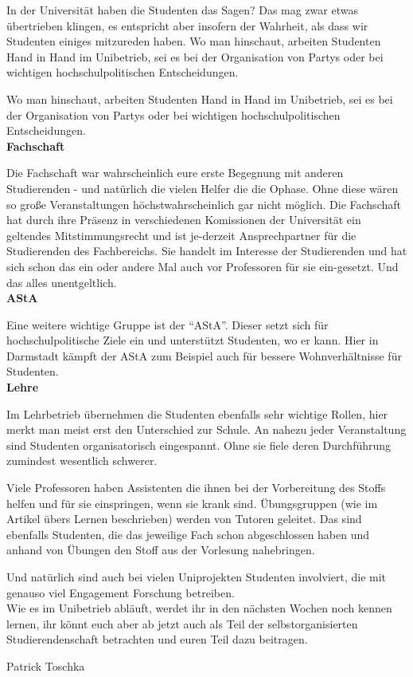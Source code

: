 {In der Universität haben die Studenten das Sagen? Das mag zwar etwas übertrieben klingen, es entspricht aber insofern der Wahrheit, als dass wir Studenten einiges mitzureden haben.
Wo man hinschaut, arbeiten Studenten Hand in Hand im Unibetrieb, sei es bei der Organisation von Partys oder bei wichtigen hochschulpolitischen Entscheidungen.
}{
Wo man hinschaut, arbeiten Studenten Hand in Hand im Unibetrieb, sei es bei der Organisation von Partys oder bei wichtigen hochschulpolitischen Entscheidungen.\\

\textbf{Fachschaft}

Die Fachschaft war wahrscheinlich eure erste Begegnung mit anderen Studierenden -  und natürlich die vielen Helfer die die Ophase. Ohne diese wären so große Veranstaltungen höchstwahrscheinlich gar nicht möglich. Die Fachschaft hat durch ihre Präsenz in verschiedenen Komissionen der Universität ein geltendes Mitstimmungsrecht und ist je-derzeit Ansprechpartner für die Studierenden des Fachbereichs. Sie handelt im Interesse der Studierenden und hat sich schon das ein oder andere Mal auch vor Professoren für sie ein-gesetzt. Und das alles unentgeltlich.\\

\textbf{AStA}

Eine weitere wichtige Gruppe ist der "`AStA"'. Dieser setzt sich für hochschulpolitische Ziele ein und unterstützt Studenten, wo er kann. Hier in Darmstadt kämpft der AStA zum Beispiel auch für bessere Wohnverhältnisse für Studenten.\\

\textbf{Lehre}

Im Lehrbetrieb übernehmen die Studenten ebenfalls sehr wichtige Rollen, hier merkt man meist erst den Unterschied zur Schule. An nahezu jeder Veranstaltung sind Studenten organisatorisch eingespannt. Ohne sie fiele deren Durchführung zumindest wesentlich schwerer.

Viele Professoren haben Assistenten die ihnen bei der Vorbereitung des Stoffs helfen und für sie einspringen, wenn sie krank sind. Übungsgruppen (wie im Artikel übers Lernen beschrieben) werden von Tutoren geleitet. Das sind ebenfalls Studenten, die das jeweilige Fach schon abgeschlossen haben und anhand von Übungen den Stoff aus der Vorlesung nahebringen. 

Und natürlich sind auch bei vielen Uniprojekten Studenten involviert, die mit genauso viel Engagement Forschung betreiben.\\

Wie es im Unibetrieb abläuft, werdet ihr in den nächsten Wochen noch kennen lernen, ihr könnt euch aber ab jetzt auch als Teil der selbstorganisierten Studierendenschaft betrachten und euren Teil dazu beitragen.
}
{Patrick Toschka}
\newpage